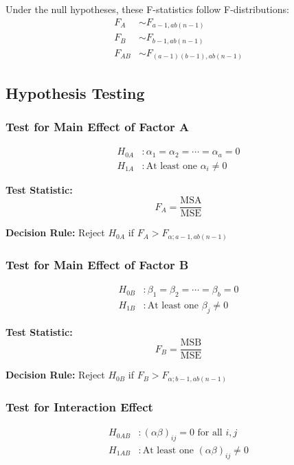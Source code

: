 \documentclass[twoside]{book}
\begin{document}
Under the null hypotheses, these F-statistics follow F-distributions:
\begin{align*}
F_A &\sim F_{a-1, ab(n-1)} \\
F_B &\sim F_{b-1, ab(n-1)} \\
F_{AB} &\sim F_{(a-1)(b-1), ab(n-1)}
\end{align*}

\subsection{Hypothesis Testing}

\subsubsection*{Test for Main Effect of Factor A}

\begin{align*}
H_{0A} &: \alpha_1 = \alpha_2 = \cdots = \alpha_a = 0 \\
H_{1A} &: \text{At least one } \alpha_i \neq 0
\end{align*}

\textbf{Test Statistic:} $$ F_A = \dfrac{\text{MSA}}{\text{MSE}} $$

\textbf{Decision Rule:} Reject $H_{0A}$ if $F_A > F_{\alpha; a-1, ab(n-1)}$

\subsubsection*{Test for Main Effect of Factor B}

\begin{align*}
H_{0B} &: \beta_1 = \beta_2 = \cdots = \beta_b = 0 \\
H_{1B} &: \text{At least one } \beta_j \neq 0
\end{align*}

\textbf{Test Statistic:} $$ F_B = \dfrac{\text{MSB}}{\text{MSE}} $$

\textbf{Decision Rule:} Reject $H_{0B}$ if $F_B > F_{\alpha; b-1, ab(n-1)}$

\subsubsection*{Test for Interaction Effect}

\begin{align*}
H_{0AB} &: (\alpha\beta)_{ij} = 0 \text{ for all } i,j \\
H_{1AB} &: \text{At least one } (\alpha\beta)_{ij} \neq 0
\end{align*}
\end{document}
